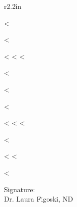 \documentclass{NDChart}
\begin{document}
\begin{wrapfigure}{r}{2.2in}

  \begin{sidebox}[frametitle={Problem List}]
    <%
    \begin{boxitemize}
      \raggedright
      <%
        \item <%
              <%
      <%
    \end{boxitemize}
    <%
  \end{sidebox}

  \vspace*{11pt}

  \begin{sidebox}[frametitle={Currently Taking}]
    <%
    \begin{boxitemize}
      \raggedright
      <%
        \item <%
              <%
      <%
    \end{boxitemize}
    <%
  \end{sidebox}

  \vspace{-2em}

\end{wrapfigure}

\nullspace

<%
<%

<%

\vfill
\begin{flushright}
Signature: \underline{\hspace{2.5in}}\\
Dr. Laura Figoski, ND
\end{flushright}
\end{document}
